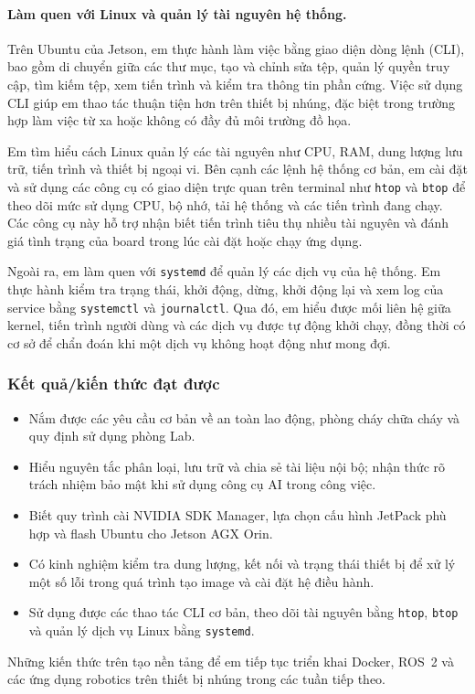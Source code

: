 \paragraph{Làm quen với Linux và quản lý tài nguyên hệ thống.}
Trên Ubuntu của Jetson, em thực hành làm việc bằng giao diện dòng lệnh (CLI), bao gồm di chuyển giữa các thư mục, tạo và chỉnh sửa tệp, quản lý quyền truy cập, tìm kiếm tệp, xem tiến trình và kiểm tra thông tin phần cứng. Việc sử dụng CLI giúp em thao tác thuận tiện hơn trên thiết bị nhúng, đặc biệt trong trường hợp làm việc từ xa hoặc không có đầy đủ môi trường đồ họa.

Em tìm hiểu cách Linux quản lý các tài nguyên như CPU, RAM, dung lượng lưu trữ, tiến trình và thiết bị ngoại vi. Bên cạnh các lệnh hệ thống cơ bản, em cài đặt và sử dụng các công cụ có giao diện trực quan trên terminal như \texttt{htop} và \texttt{btop} để theo dõi mức sử dụng CPU, bộ nhớ, tải hệ thống và các tiến trình đang chạy. Các công cụ này hỗ trợ nhận biết tiến trình tiêu thụ nhiều tài nguyên và đánh giá tình trạng của board trong lúc cài đặt hoặc chạy ứng dụng.

Ngoài ra, em làm quen với \texttt{systemd} để quản lý các dịch vụ của hệ thống. Em thực hành kiểm tra trạng thái, khởi động, dừng, khởi động lại và xem log của service bằng \texttt{systemctl} và \texttt{journalctl}. Qua đó, em hiểu được mối liên hệ giữa kernel, tiến trình người dùng và các dịch vụ được tự động khởi chạy, đồng thời có cơ sở để chẩn đoán khi một dịch vụ không hoạt động như mong đợi.

\subsubsection{Kết quả/kiến thức đạt được}
\begin{itemize}
    \item Nắm được các yêu cầu cơ bản về an toàn lao động, phòng cháy chữa cháy và quy định sử dụng phòng Lab.
    \item Hiểu nguyên tắc phân loại, lưu trữ và chia sẻ tài liệu nội bộ; nhận thức rõ trách nhiệm bảo mật khi sử dụng công cụ AI trong công việc.
    \item Biết quy trình cài NVIDIA SDK Manager, lựa chọn cấu hình JetPack phù hợp và flash Ubuntu cho Jetson AGX Orin.
    \item Có kinh nghiệm kiểm tra dung lượng, kết nối và trạng thái thiết bị để xử lý một số lỗi trong quá trình tạo image và cài đặt hệ điều hành.
    \item Sử dụng được các thao tác CLI cơ bản, theo dõi tài nguyên bằng \texttt{htop}, \texttt{btop} và quản lý dịch vụ Linux bằng \texttt{systemd}.
\end{itemize}
Những kiến thức trên tạo nền tảng để em tiếp tục triển khai Docker, ROS~2 và các ứng dụng robotics trên thiết bị nhúng trong các tuần tiếp theo.
